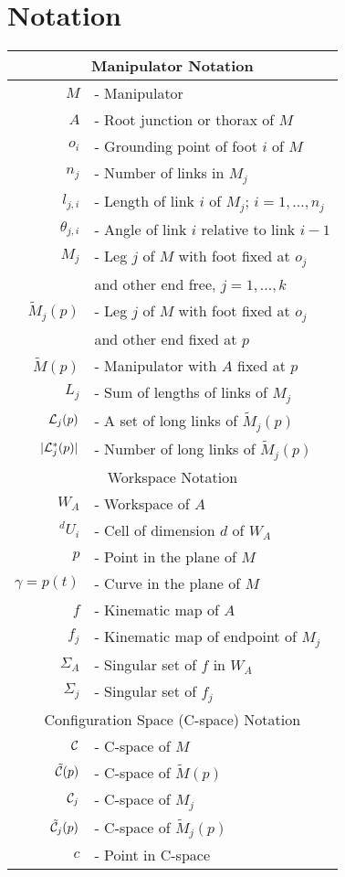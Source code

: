 \documentclass[twocolumn]{IEEEtran}
\begin{document}
\section{Notation}
\begin{center}
\begin{tabular}{rl}
\hline \hline \multicolumn{2}{c}{Manipulator Notation} \\ \hline
${M}$ & - Manipulator \\
$A$ & - Root junction or thorax of ${M}$ \\
$o_i$ & - Grounding point of foot $i$ of ${M}$ \\
$n_j$ & - Number of links in ${M}_j$ \\
$l_{j,i}$ & - Length of link $i$ of ${M}_j$; $i=1,...,n_j$ \\
$\theta_{j,i}$ & - Angle of link $i$ relative to link $i-1$ \\
${M}_j$ & - Leg $j$ of ${M}$ with foot fixed at $o_j$ \\
               & and other end free, $j=1,...,k$ \\
$\tilde {M}_j(p)$ & - Leg $j$ of ${M}$ with foot fixed at $o_j$\\
               & and other end fixed at $p$ \\
$\tilde {M}(p)$ & - Manipulator with $A$ fixed at $p$\\
$L_j$ & - Sum of lengths of links of ${M}_j$ \\
${\cal L}_j(p)$ & - A set of long links of $\tilde {M}_j(p)$ \\
$|{\cal L}_j^*(p)|$ & - Number of long links of $\tilde {M}_j(p)$ \\
               \hline \hline
  \multicolumn{2}{c}{Workspace Notation} \\ \hline
$W_A$ & - Workspace of $A$ \\
$^dU_i$ & - Cell of dimension $d$ of $W_A$ \\
$p$ & - Point in the plane of ${M}$ \\
$\gamma = p(t)$ & - Curve in the plane of ${M}$ \\
$f$ & - Kinematic map of $A$ \\
$f_j$ & - Kinematic map of endpoint of $M_j$ \\
$\Sigma_A$ & - Singular set of $f$ in $W_A$  \\
$\Sigma_j$ & - Singular set of $f_j$ \\
                 \hline \hline
  \multicolumn{2}{c}{Configuration Space (C-space) Notation} \\
\hline
${\cal C}$ & - C-space of ${M}$ \\
$\tilde {\cal C}(p)$ & - C-space of $\tilde {M}(p)$ \\
${\cal C}_j$ & - C-space of ${M}_j$ \\
$\tilde {\cal C}_j(p)$ & - C-space of $\tilde {M}_j(p)$ \\
$c$ & - Point in C-space \\ \hline \hline
\end{tabular}
\end{center}
\end{document}
